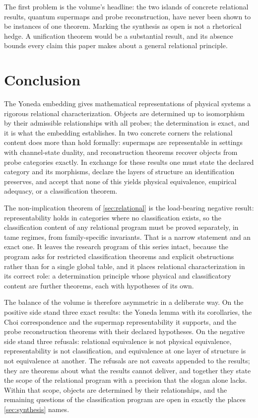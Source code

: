 \documentclass[11pt,letterpaper]{article}
\theoremstyle{definition}
\theoremstyle{remark}
\begin{document}
The first problem is the volume's headline: the two islands of concrete relational results, quantum supermaps and probe reconstruction, have never been shown to be instances of one theorem. Marking the synthesis as open is not a rhetorical hedge. A unification theorem would be a substantial result, and its absence bounds every claim this paper makes about a general relational principle.

\section{Conclusion}
\label{sec:conclusion}

The Yoneda embedding gives mathematical representations of physical systems a rigorous relational characterization. Objects are determined up to isomorphism by their admissible relationships with all probes; the determination is exact, and it is what the embedding establishes. In two concrete corners the relational content does more than hold formally: supermaps are representable in settings with channel-state duality, and reconstruction theorems recover objects from probe categories exactly. In exchange for these results one must state the declared category and its morphisms, declare the layers of structure an identification preserves, and accept that none of this yields physical equivalence, empirical adequacy, or a classification theorem.

The non-implication theorem of \cref{sec:relational} is the load-bearing negative result: representability holds in categories where no classification exists, so the classification content of any relational program must be proved separately, in tame regimes, from family-specific invariants. That is a narrow statement and an exact one. It leaves the research program of this series intact, because the program asks for restricted classification theorems and explicit obstructions rather than for a single global table, and it places relational characterization in its correct role: a determination principle whose physical and classificatory content are further theorems, each with hypotheses of its own.

The balance of the volume is therefore asymmetric in a deliberate way. On the positive side stand three exact results: the Yoneda lemma with its corollaries, the Choi correspondence and the supermap representability it supports, and the probe reconstruction theorems with their declared hypotheses. On the negative side stand three refusals: relational equivalence is not physical equivalence, representability is not classification, and equivalence at one layer of structure is not equivalence at another. The refusals are not caveats appended to the results; they are theorems about what the results cannot deliver, and together they state the scope of the relational program with a precision that the slogan alone lacks. Within that scope, objects are determined by their relationships, and the remaining questions of the classification program are open in exactly the places \cref{sec:synthesis} names.
\end{document}
